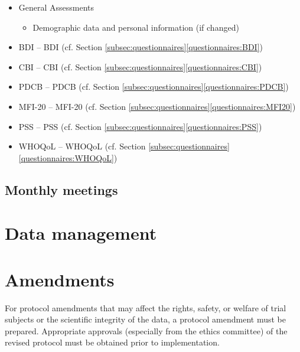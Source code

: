 \begin{itemize}[noitemsep,topsep=0pt]
\item General Assessments
\begin{itemize}[noitemsep,topsep=0pt]
\item Demographic data and personal information (if changed)
\end{itemize}
\item \acl{BDI} -- \acs{BDI} (cf. Section \ref{subsec:questionnaires}\ref{questionnaires:BDI})
\item \acl{CBI} -- \acs{CBI} (cf. Section \ref{subsec:questionnaires}\ref{questionnaires:CBI})
\item \acl{PDCB} -- \acs{PDCB} (cf. Section \ref{subsec:questionnaires}\ref{questionnaires:PDCB})
\item \acl{MFI-20} -- \acs{MFI-20} (cf. Section \ref{subsec:questionnaires}\ref{questionnaires:MFI20})
\item \acl{PSS} -- \acs{PSS} (cf. Section \ref{subsec:questionnaires}\ref{questionnaires:PSS})
\item \acl{WHOQoL} -- \acs{WHOQoL} (cf. Section \ref{subsec:questionnaires}\ref{questionnaires:WHOQoL})
\end{itemize}

\subsection{Monthly meetings}

\section{Data management}

\section{Amendments}
For protocol amendments that may affect the rights, safety, or welfare of trial subjects or the scientific integrity of the data, a protocol amendment must be prepared. Appropriate approvals (especially from the ethics committee) of the revised protocol must be obtained prior to implementation.

